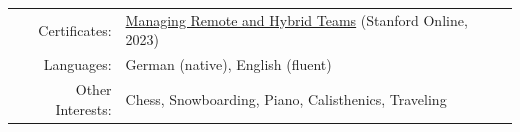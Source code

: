 \documentclass[a4paper,10pt]{article}
\begin{document}
\begin{tabular}{rl}
 Certificates: & \small \href{https://digitalcredential.stanford.edu/check/39630025A12C2EB7C4949C5B5DB1DDC7D0DFF92B2D09C7D43679B83124771827QmZ2c3BqZEhvVFBUV29FOGRRWE11Uy9YWm91TjkydDFuRjVWY0ZPU1JjZnBhMHJI}{Managing Remote and Hybrid Teams} (Stanford Online, 2023) \\[0.5mm]
 Languages: & \small German (native), English (fluent) \\[0.5mm]
 Other Interests: & \small Chess, Snowboarding, Piano, Calisthenics, Traveling
 \\[4mm]
 
\end{tabular}



  


  
  
\end{document}
